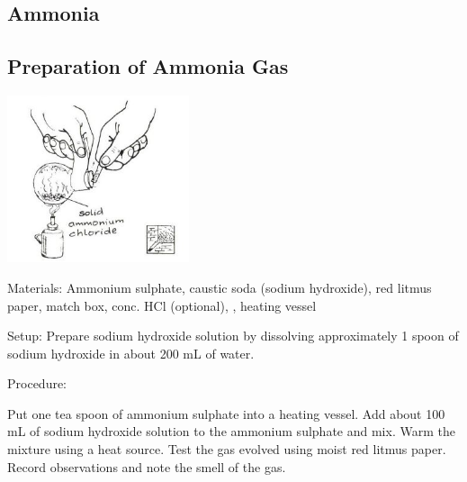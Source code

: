 \begin{multicols}{2}

\section*{Ammonia}


\subsection{Preparation of Ammonia Gas} %

\begin{center}
\includegraphics[width=0.4\textwidth]{./img/source/ammonia.jpg}
\end{center}

\begin{description*}
\item[Materials:]{Ammonium sulphate, caustic soda (sodium hydroxide),
red litmus paper, match box, conc. HCl (optional), , heating
vessel}
\item[Setup:]{Prepare sodium hydroxide solution by dissolving approximately 1 spoon of
sodium hydroxide in about 200 mL of water.}
\item[Procedure:]{Put one tea spoon of ammonium sulphate into a heating vessel. Add about 100 mL of sodium hydroxide solution to the ammonium
sulphate and mix. Warm the mixture using a heat source. Test the gas evolved using moist red litmus paper. Record observations and note the smell of the gas.

}
\end{description*}
\end{multicols}
